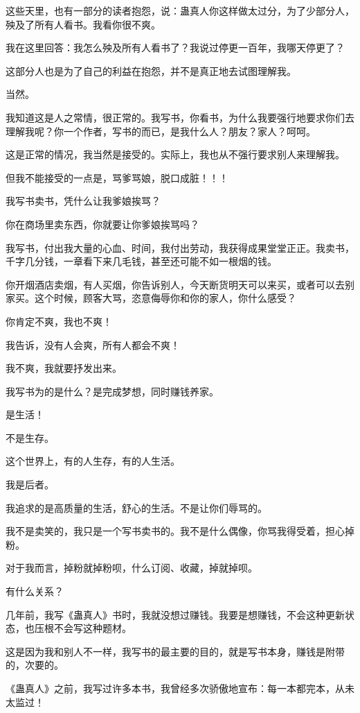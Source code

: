 \begin{this_body}
这些天里，也有一部分的读者抱怨，说：蛊真人你这样做太过分，为了少部分人，殃及了所有人看书。我看你很不爽。

我在这里回答：我怎么殃及所有人看书了？我说过停更一百年，我哪天停更了？

这部分人也是为了自己的利益在抱怨，并不是真正地去试图理解我。

当然。

我知道这是人之常情，很正常的。我写书，你看书，为什么我要强行地要求你们去理解我呢？你一个作者，写书的而已，是我什么人？朋友？家人？呵呵。

这是正常的情况，我当然是接受的。实际上，我也从不强行要求别人来理解我。

但我不能接受的一点是，骂爹骂娘，脱口成脏！！！

我写书卖书，凭什么让我爹娘挨骂？

你在商场里卖东西，你就要让你爹娘挨骂吗？

我写书，付出我大量的心血、时间，我付出劳动，我获得成果堂堂正正。我卖书，千字几分钱，一章看下来几毛钱，甚至还可能不如一根烟的钱。

你开烟酒店卖烟，有人买烟，你告诉别人，今天断货明天可以来买，或者可以去别家买。这个时候，顾客大骂，恣意侮辱你和你的家人，你什么感受？

你肯定不爽，我也不爽！

我告诉，没有人会爽，所有人都会不爽！

我不爽，我就要抒发出来。

我写书为的是什么？是完成梦想，同时赚钱养家。

是生活！

不是生存。

这个世界上，有的人生存，有的人生活。

我是后者。

我追求的是高质量的生活，舒心的生活。不是让你们辱骂的。

我不是卖笑的，我只是一个写书卖书的。我不是什么偶像，你骂我得受着，担心掉粉。

对于我而言，掉粉就掉粉呗，什么订阅、收藏，掉就掉呗。

有什么关系？

几年前，我写《蛊真人》书时，我就没想过赚钱。我要是想赚钱，不会这种更新状态，也压根不会写这种题材。

这是因为我和别人不一样，我写书的最主要的目的，就是写书本身，赚钱是附带的，次要的。

《蛊真人》之前，我写过许多本书，我曾经多次骄傲地宣布：每一本都完本，从未太监过！


\end{this_body}
